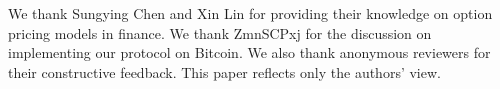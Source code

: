 \documentclass[sigconf, natbib=false]{acmart}
\renewcommand\_{\textunderscore\allowbreak}
\begin{document}












\begin{acks}
We thank Sungying Chen and Xin Lin for providing their knowledge on option pricing models in finance.
We thank ZmnSCPxj for the discussion on implementing our protocol on Bitcoin.
We also thank anonymous reviewers for their constructive feedback.
This paper reflects only the authors’ view.
\end{acks}

\printbibliography


\end{document}

